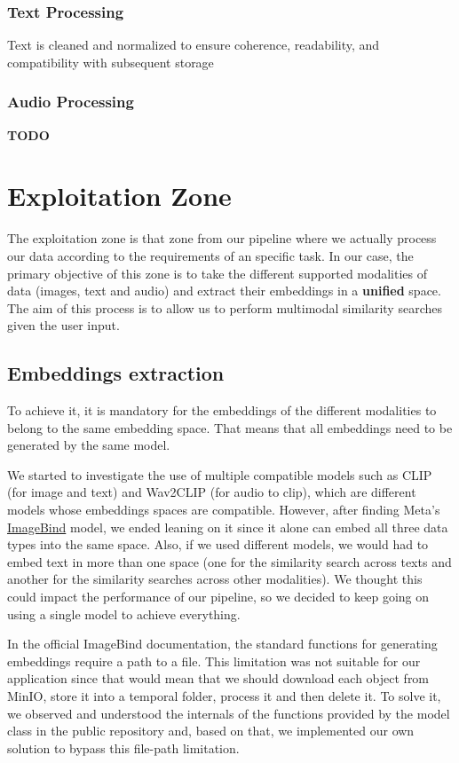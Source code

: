 \documentclass[12pt]{article}
\begin{document}
\subsubsection{Text Processing}
Text is cleaned and normalized to ensure coherence, readability, and compatibility with subsequent storage

\subsubsection{Audio Processing}
\textbf{TODO}

\section{Exploitation Zone}
The exploitation zone is that zone from our pipeline where we actually process our data according to the requirements of an specific task. In our case, the primary objective of this zone is to take the different supported modalities of data (images, text and audio) and extract their embeddings in a \textbf{unified} space. The aim of this process is to allow us to perform multimodal similarity searches given the user input.

\subsection{Embeddings extraction}
To achieve it, it is mandatory for the embeddings of the different modalities to belong to the same embedding space. That means that all embeddings need to be generated by the same model.

We started to investigate the use of multiple compatible models such as CLIP (for image and text) and Wav2CLIP (for audio to clip), which are different models whose embeddings spaces are compatible. However, after finding Meta's \href{https://github.com/facebookresearch/ImageBind}{ImageBind} model, we ended leaning on it since it alone can embed all three data types into the same space. Also, if we used different models, we would had to embed text in more than one space (one for the similarity search across texts and another for the similarity searches across other modalities). We thought this could impact the performance of our pipeline, so we decided to keep going on using a single model to achieve everything.

In the official ImageBind documentation, the standard functions for generating embeddings require a path to a file. This limitation was not suitable for our application since that would mean that we should download each object from MinIO, store it into a temporal folder, process it and then delete it. To solve it, we observed and understood the internals of the functions provided by the model class in the public repository and, based on that, we implemented our own solution to bypass this file-path limitation.
\end{document}
